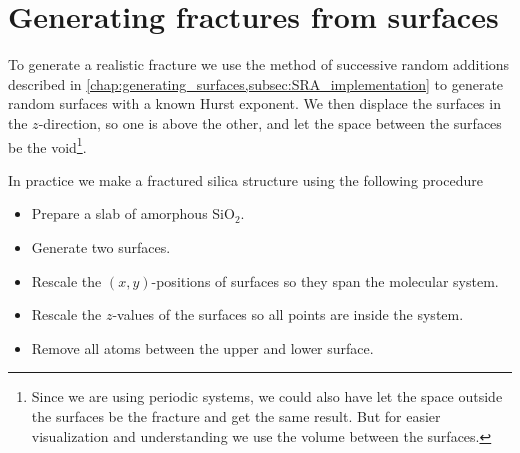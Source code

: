 \section{Generating fractures from surfaces\label{sec:generating_fractures}}
To generate a realistic fracture we use the method of successive random additions described in \cref{chap:generating_surfaces,subsec:SRA_implementation} to generate random surfaces with a known Hurst exponent. We then displace the surfaces in the $z$-direction, so one is above the other, and let the space between the surfaces be the void\footnote{Since we are using periodic systems, we could also have let the space outside the surfaces be the fracture and get the same result. But for easier visualization and understanding we use the volume between the surfaces.}.

In practice we make a fractured silica structure using the following procedure
\begin{itemize}
    \item Prepare a slab of amorphous SiO$_2$.
    \item Generate two surfaces.
    \item Rescale the $(x,y)$-positions of surfaces so they span the molecular system.
    \item Rescale the $z$-values of the surfaces so all points are inside the system.
    \item Remove all atoms between the upper and lower surface.
\end{itemize}

